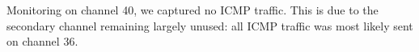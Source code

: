 Monitoring on channel 40, we captured no ICMP traffic. This is due to the secondary channel remaining largely unused: all ICMP traffic was most likely sent on channel 36.
